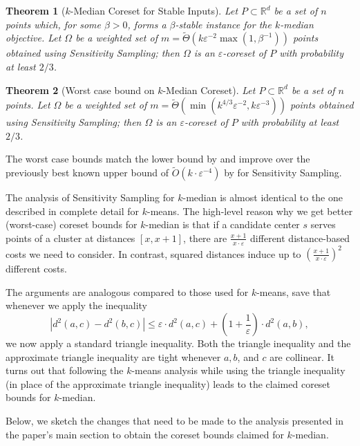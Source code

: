 \documentclass[11pt]{article}
\newtheorem{theorem}{Theorem}
\theoremstyle{restate}
\theoremstyle{definition}
\newcommand{\eps}{\ensuremath{\varepsilon}}
\newcommand{\R}{\ensuremath{\mathbb{R}}}
\begin{document}
\begin{theorem}[$k$-Median Coreset for Stable Inputs]\label{thm:median1}
Let $P \subset \R^d$ be a set of $n$ points which, for some $\beta > 0$, forms a $\beta$-stable instance for the $k$-median objective. Let $\Omega$ be a weighted set of $m = \tilde{\Theta}(k \eps^{-2} \max(1, \beta^{-1}))$ points obtained using Sensitivity Sampling; then $\Omega$ is an $\eps$-coreset of $P$ with probability at least $2/3$. 
\end{theorem}

\begin{theorem}[Worst case bound on $k$-Median Coreset]\label{thm:median2}
    Let $P \subset \R^d$ be a set of $n$ points. Let $\Omega$ be a weighted set of $m = \tilde{\Theta}(\min(k^{4/3} \eps^{-2}, k \eps^{-3}))$ points obtained using Sensitivity Sampling; then $\Omega$ is an $\eps$-coreset of $P$ with probability at least $2/3$.
\end{theorem}

The worst case bounds match the lower bound by \cite{HLW23} and improve over the previously best known upper bound of $\tilde{O}(k\cdot \varepsilon^{-4})$ by \cite{huang2020coresets} for Sensitivity Sampling.

The analysis of Sensitivity Sampling for $k$-median is almost identical to the one described in complete detail for $k$-means. The high-level reason why we get better (worst-case) coreset bounds for $k$-median is that if a candidate center $s$ serves points of a cluster at distances $[x,x+1]$, there are $\frac{x+1}{x\cdot \varepsilon}$ different distance-based costs we need to consider. In contrast, squared distances induce up to $\left(\frac{x+1}{x\cdot \varepsilon}\right)^2$ different costs.

The arguments are analogous compared to those used for $k$-means, save that whenever we apply the inequality
$$|d^2(a,c)-d^2(b,c)|\leq \varepsilon\cdot d^2(a,c) + \left(1+\frac{1}{\varepsilon}\right)\cdot d^2(a,b),$$
we now apply a standard triangle inequality.
Both the triangle inequality and the approximate triangle inequality are tight whenever $a,b$, and $c$ are collinear. It turns out that following the $k$-means analysis while using the triangle inequality (in place of the approximate triangle inequality) leads to the claimed coreset bounds for $k$-median. 


 Below, we sketch the changes that need to be made to the analysis presented in the paper's main section to obtain the coreset bounds claimed for $k$-median.
\end{document}

